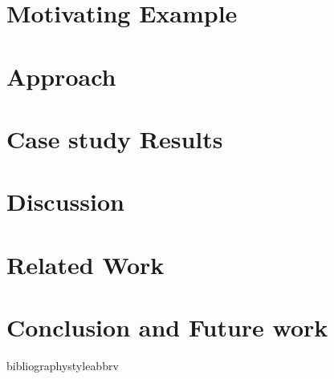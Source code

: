 \documentclass{sig-alternate}
\begin{document}
\section{Motivating Example}
\label{sec:motivating_example}


\section{Approach}
\label{sec:approach}


\section{Case study Results}
\label{sec:case_study_results}


\section{Discussion}
\label{sec:discussion}


\section{Related Work}
\label{sec:related_work}


\section{Conclusion and Future work}
\label{sec:conclusion}


bibliographystyle{abbrv}
  
\end{document}
